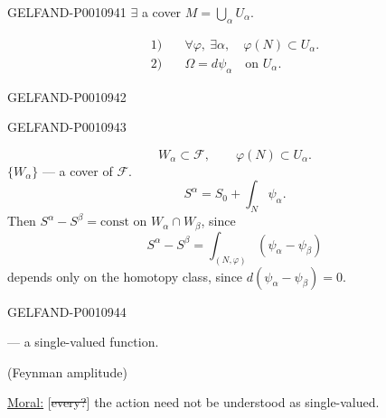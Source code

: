 \begin{GelfandAdjacentEvidence}{GELFAND-P001094}{1}
$\exists$ a cover $M=\bigcup_\alpha U_\alpha$.

\[
\begin{aligned}
1)&\quad \forall\varphi,\ \exists\alpha,\quad \varphi(N)\subset U_\alpha.\\
2)&\quad \Omega=d\psi_\alpha\quad \text{on }U_\alpha.
\end{aligned}
\]
\end{GelfandAdjacentEvidence}
\begin{GelfandAdjacentEvidence}{GELFAND-P001094}{2}

\end{GelfandAdjacentEvidence}
\begin{GelfandAdjacentEvidence}{GELFAND-P001094}{3}


\[
W_\alpha\subset\mathcal F,\qquad \varphi(N)\subset U_\alpha.
\]
$\{W_\alpha\}$ — a cover of $\mathcal F$.
\[
S^\alpha=S_0+\int_N\psi_\alpha.
\]
Then $S^\alpha-S^\beta=\mathrm{const}$ on $W_\alpha\cap W_\beta$, since
\[
S^\alpha-S^\beta=\int_{(N,\varphi)}(\psi_\alpha-\psi_\beta)
\]
depends only on the homotopy class, since $d(\psi_\alpha-\psi_\beta)=0$.

\end{GelfandAdjacentEvidence}
\begin{GelfandAdjacentEvidence}{GELFAND-P001094}{4}


 — a single-valued function.

(Feynman amplitude)

\underline{Moral:} [\sout{every?}] the action need not be understood as single-valued.
\end{GelfandAdjacentEvidence}
